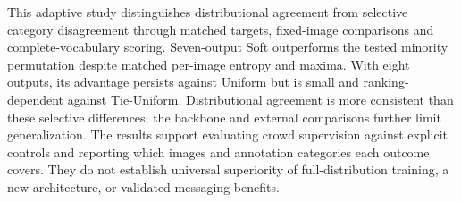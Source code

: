 This adaptive study distinguishes distributional agreement from selective category disagreement through matched targets, fixed-image comparisons and complete-vocabulary scoring. Seven-output Soft outperforms the tested minority permutation despite matched per-image entropy and maxima. With eight outputs, its advantage persists against Uniform but is small and ranking-dependent against Tie-Uniform. Distributional agreement is more consistent than these selective differences; the backbone and external comparisons further limit generalization. The results support evaluating crowd supervision against explicit controls and reporting which images and annotation categories each outcome covers. They do not establish universal superiority of full-distribution training, a new architecture, or validated messaging benefits.
